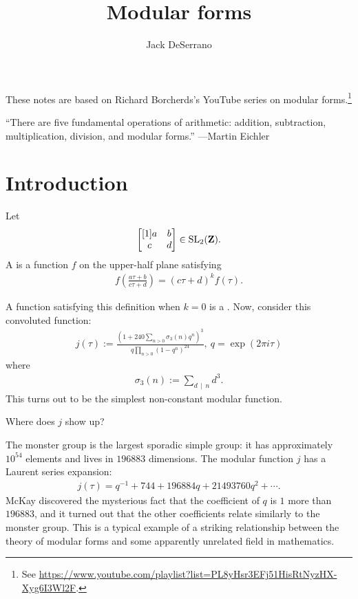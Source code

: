 \documentclass[11pt, oneside,margin=1in]{article}
\title{Modular forms}
\author{Jack DeSerrano}
\begin{document}
\ifams
    \vspace*{\fill}
\fi
\maketitle
These notes are based on Richard Borcherds's YouTube series on modular forms.\footnote{See \url{https://www.youtube.com/playlist?list=PL8yHsr3EFj51HisRtNyzHX-Xyg6I3Wl2F}.}
\ifams
	\vspace*{\fill}
\fi
\vfill
\begin{center}
	``There are five fundamental operations of arithmetic: addition, subtraction, multiplication, division, and modular forms.'' ---Martin Eichler
\end{center}
{\vfill}
\newpage
\section{Introduction}
\begin{definition}\label{}\text{}
Let 
\begin{align*}
	\begin{bmatrix} [1] a&b\\c&d\end{bmatrix} \in \operatorname{SL}_{2}(\mathbf Z).
\end{align*}
A  is a function $f$ on the upper-half plane satisfying
\begin{align*}
	f\left( \frac{a\tau + b}{c\tau + d} \right) = (c\tau + d) ^k f(\tau).
\end{align*}
\end{definition}
\begin{example}\label{}\text{}
A function satisfying this definition when $k=0$ is a . Now, consider this convoluted function:
\begin{align*}
	j(\tau) :=  \frac{\left(1 + 240 \sum_{n>0}^{} \sigma_3(n)q^n \right)^3}{q \prod_{n>0} (1-q^n)^{24}},\ q= \exp(2\pi i \tau)
\end{align*}
where
\begin{align*}
	\sigma_3(n) :=  \sum_{d\, \mid\,  n}^{} d^3.
\end{align*}
This turns out to be the simplest non-constant modular function.
\end{example}

Where does $j$ show up?

\begin{example}\label{}\text{}
The monster group is the largest sporadic simple group: it has approximately $10^{54}$ elements and lives in $196883$ dimensions. The modular function $j$ has a Laurent series expansion:
\begin{align*}
	j(\tau) = q ^{-1} + 744 + 196884q + 21493760q^2 + \cdots.
\end{align*}
McKay discovered the mysterious fact that the coefficient of $q$ is $1$ more than $196883$, and it turned out that the other coefficients relate similarly to the monster group. This is a typical example of a striking relationship between the theory of modular forms and some apparently unrelated field in mathematics. 
\end{example}
\end{document}
